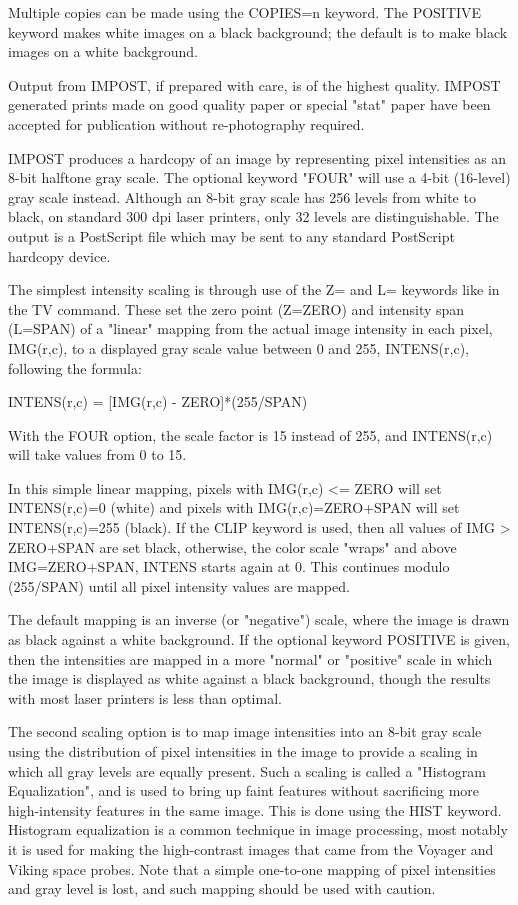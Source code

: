 Multiple copies can be made using the COPIES=n keyword.  The POSITIVE
keyword makes white images on a black background; the default is to make
black images on a white background.

Output from IMPOST, if prepared with care, is of the highest quality.
IMPOST generated prints made on good quality paper or special "stat" paper
have been accepted for publication without re-photography required.


IMPOST produces a hardcopy of an image by representing pixel intensities as
an 8-bit halftone gray scale.  The optional keyword "FOUR" will use a 4-bit
(16-level) gray scale instead.  Although an 8-bit gray scale has 256 levels
from white to black, on standard 300 dpi laser printers, only 32 levels are
distinguishable.  The output is a PostScript file which may be sent to any
standard PostScript hardcopy device.


The simplest intensity scaling is through use of the Z= and L= keywords
like in the TV command.  These set the zero point (Z=ZERO) and intensity
span (L=SPAN) of a "linear" mapping from the actual image intensity in each
pixel, IMG(r,c), to a displayed gray scale value between 0 and 255,
INTENS(r,c), following the formula:
\begin{hanging}
  \item{          INTENS(r,c) = {[IMG(r,c) - ZERO]}*(255/SPAN)}
\end{hanging}
With the FOUR option, the scale factor is 15 instead of 255, and
INTENS(r,c) will take values from 0 to 15.

In this simple linear mapping, pixels with IMG(r,c) <= ZERO will set
INTENS(r,c)=0 (white) and pixels with IMG(r,c)=ZERO+SPAN will set
INTENS(r,c)=255 (black).  If the CLIP keyword is used, then all values of
IMG > ZERO+SPAN are set black, otherwise, the color scale "wraps" and above
IMG=ZERO+SPAN, INTENS starts again at 0.  This continues modulo (255/SPAN)
until all pixel intensity values are mapped.

The default mapping is an inverse (or "negative") scale, where the image is
drawn as black against a white background.  If the optional keyword
POSITIVE is given, then the intensities are mapped in a more "normal" or
"positive" scale in which the image is displayed as white against a black
background, though the results with most laser printers is less than
optimal.

The second scaling option is to map image intensities into an 8-bit gray
scale using the distribution of pixel intensities in the image to provide a
scaling in which all gray levels are equally present.  Such a scaling is
called a "Histogram Equalization", and is used to bring up faint features
without sacrificing more high-intensity features in the same image.  This
is done using the HIST keyword.  Histogram equalization is a common
technique in image processing, most notably it is used for making the
high-contrast images that came from the Voyager and Viking space probes.
Note that a simple one-to-one mapping of pixel intensities and gray level
is lost, and such mapping should be used with caution.

